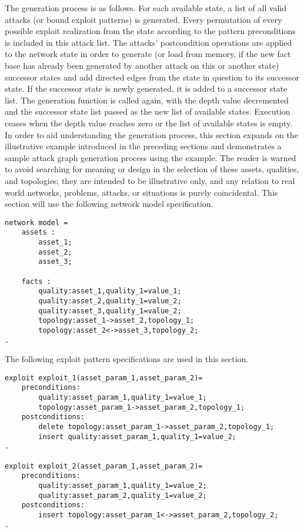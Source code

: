 The generation process is as follows. For each available state, a list of all valid 
attacks (or bound exploit patterns) is generated. 
Every permutation of every possible exploit realization from the state according to
the pattern preconditions is included in this attack list. The attacks' postcondition
operations are applied to the network state in order to generate (or load from memory, if
the new fact base has already been generated by another attack on this or another state)
successor states and add directed edges from the state in question to its successor state.
If the successor state is newly generated, it is added to a successor state list.
The generation function is called again, with the depth value decremented and the successor
state list passed as the new list of available states. Execution ceases when the depth
value reaches zero or the list of available states is empty.
In order to aid understanding the generation process, this section expands on the
illustrative example introduced in the preceding sections and demonstrates a
sample attack graph generation process using the example. The reader is warned to
avoid searching for meaning or design in the selection of these assets, qualities,
and topologies; they are intended to be illustrative only, and any relation to 
real world networks, problems, attacks, or situations is purely coincidental.
This section will use the following network model specification.
\begin{lstlisting}
network model = 
    assets :
        asset_1;
        asset_2;
        asset_3;

    facts :
        quality:asset_1,quality_1=value_1;
        quality:asset_2,quality_1=value_2;        
        quality:asset_3,quality_1=value_2;
        topology:asset_1->asset_2,topology_1;
        topology:asset_2<->asset_3,topology_2;
.
\end{lstlisting}

The following exploit pattern specifications are used in this section.
\begin{lstlisting}
exploit exploit_1(asset_param_1,asset_param_2)=
    preconditions:
        quality:asset_param_1,quality_1=value_1;
        topology:asset_param_1->asset_param_2,topology_1;
    postconditions:
        delete topology:asset_param_1->asset_param_2,topology_1;
        insert quality:asset_param_1,quality_1=value_2;
.

exploit exploit_2(asset_param_1,asset_param_2)=
    preconditions:
        quality:asset_param_1,quality_1=value_2;
        quality:asset_param_2,quality_1=value_2;
    postconditions:
        insert topology:asset_param_1<->asset_param_2,topology_2;
.
\end{lstlisting}

